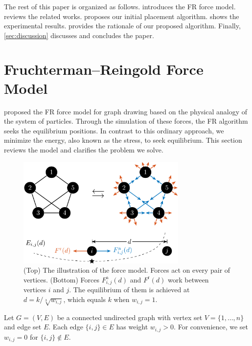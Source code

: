 \documentclass[dvipdfmx,10pt,journal,compsoc]{IEEEtran}
\begin{document}
The rest of this paper is organized as follows.
 introduces the FR force model.
 reviews the related works.
 proposes our initial placement algorithm.
 shows the experimental results.
 provides the rationale of our proposed algorithm.
Finally, \cref{sec:discussion} discusses and concludes the paper.

\section{Fruchterman--Reingold Force Model}\label{sec:FR_ForceModel}

\citet{fruchtermanGraphDrawingForcedirected1991} proposed the FR force model for graph drawing based on the physical analogy of the system of particles.
Through the simulation of these forces, the FR algorithm seeks the equilibrium positions.
In contrast to this ordinary approach, we minimize the energy, also known as the stress, to seek equilibrium.
This section reviews the model and clarifies the problem we solve.

\begin{figure}[t]
  \centering
  \includegraphics[height=5.5cm]{fr_layout/fr_layout.pdf}
  \caption{
    (Top) The illustration of the force model. Forces act on every pair of vertices.
    (Bottom) Forces $F_{i,j}^\mathrm{a}(d)$ and $F^\mathrm{r}(d)$ work between vertices $i$ and $j$. The equilibrium of them is achieved at $d = k/\sqrt[3]{w_{i,j}}$, which equals $k$ when $w_{i,j} = 1$.
  }
  \label{fig:frLayout}
\end{figure}

Let $G = (V, E)$ be a connected undirected graph with vertex set $V = \{1, \dots, n\}$ and edge set $E$.
Each edge $\{ i,j\} \in E$ has weight $w_{i,j}>0$.
For convenience, we set $w_{i,j}=0$ for $\{i, j\} \notin E$.
\end{document}

